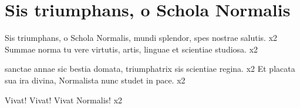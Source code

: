 \section{Sis triumphans, o Schola Normalis}
\begin{canzone}
Sis triumphans, o Schola Normalis,
mundi splendor, spes nostrae salutis. \hspace{2em} {\small x2}
Summae norma tu vere virtutis,
artis, linguae et scientiae studiosa. \hspace{3.4em} {\small x2}

{\normalsize s}anctae {\normalsize a}nnae sic bestia domata,
triumphatrix sis scientiae regina. \hspace{4.2em} {\small x2}
Et placata sua ira divina,
Normalista nunc studet in pace. \hspace{4.5em} {\small x2}

Vivat! Vivat! Vivat Normalis! \hspace{6.8em} {\small x2}
\end{canzone}
